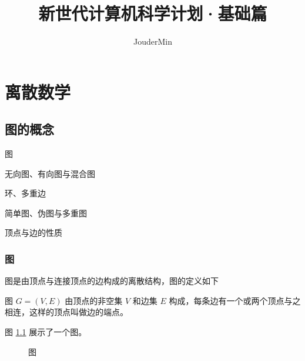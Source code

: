 \documentclass[lang=cn, chinesefont=founder, color=cyan, citestyle=gb7714-2015, bibstyle=gb7714-2015]{elegantbook}
\title{新世代计算机科学计划·基础篇}
\author{JouderMin}
\institute{「新世代计算机科学计划」制作委员会}
\date{\zhtoday}
\begin{document}
\maketitle
\frontmatter

\tableofcontents

\mainmatter

\chapter{离散数学}



\section{图的概念}
\begin{introduction}
    \item 图
    \item 无向图、有向图与混合图
    \item 环、多重边
    \item 简单图、伪图与多重图
    \item 顶点与边的性质
\end{introduction}

\subsection{图}
图是由顶点与连接顶点的边构成的离散结构，图的定义如下
\begin{definition}[图]\label{def:图}
    图 $G = (V, E)$ 由顶点的非空集 $V$ 和边集 $E$ 构成，每条边有一个或两个顶点与之相连，这样的顶点叫做边的端点。
\end{definition}

图 \ref{fig:图} 展示了一个图。
\begin{figure}[htbp!]
    \centering
    \caption{图}
    \label{fig:图}
\end{figure}
\end{document}

